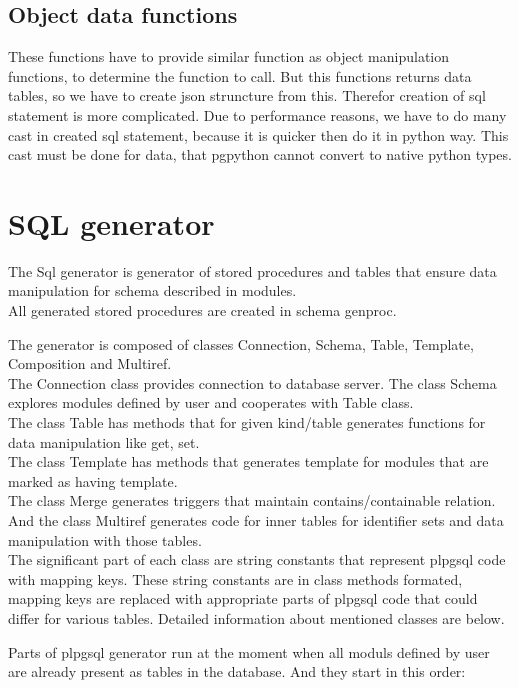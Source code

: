 \documentclass[deska]{subfiles}
\begin{document}
\subsection{Object data functions}
These functions have to provide similar function as object manipulation functions, to determine the function to call. But this functions returns data tables, so we have to create json struncture from this. Therefor creation of sql statement is more complicated. Due to performance reasons, we have to do many cast in created sql statement, because it is quicker then do it in python way. This cast must be done for data, that pgpython cannot convert to native python types.

\section{SQL generator}
The Sql generator is generator of stored procedures and tables that ensure data manipulation for schema described in modules.\\
All generated stored procedures are created in schema genproc.

The generator is composed of classes Connection, Schema, Table, Template, Composition and Multiref.\\
The Connection class provides connection to database server.
The class Schema explores modules defined by user and cooperates with Table class.\\
The class Table has methods that for given kind/table generates functions for data manipulation like get, set.\\
The class Template has methods that generates template for modules that are marked as having template.\\
The class Merge generates triggers that maintain contains/containable relation.\\
And the class Multiref generates code for inner tables for identifier sets and data manipulation with those tables.\\

The significant part of each class are string constants that represent plpgsql code with mapping keys. These string constants are in class methods formated, mapping keys are replaced with appropriate parts of plpgsql code that could differ for various tables.
Detailed information about mentioned classes are below.

Parts of plpgsql generator run at the moment when all moduls defined by user are already present as tables in the database. And they start in this order:
\end{document}
